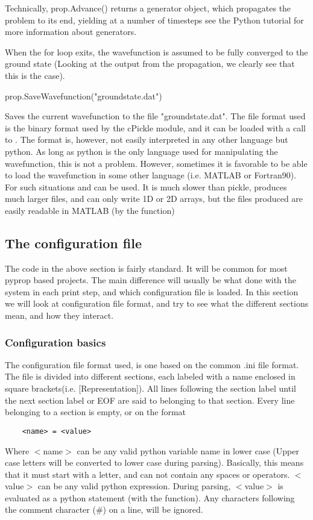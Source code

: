 Technically, prop.Advance() returns a generator object, which propagates the problem to its end, yielding at a number of 
timesteps see the Python tutorial \cite{pythonTut} for more information about generators.

When the for loop exits, the wavefunction is assumed to be fully converged to the ground state (Looking at the output
from the propagation, we clearly see that this is the case). 
\begin{python}	
	prop.SaveWavefunction("groundstate.dat")
\end{python}
Saves the current wavefunction to the file "groundstate.dat". The file format used is the binary format used
by the cPickle module, and it can be loaded with a call to . The format is, however, not 
easily interpreted in any other language but python. As long as python is the only language used for manipulating the 
wavefunction, this is not a problem. However, sometimes it is favorable to be able to load the wavefunction in some
other language (i.e. MATLAB or Fortran90). For such situations  and
can be used. It is much slower than pickle, produces much larger files, and can only write 1D or 2D arrays, but the files
produced are easily readable in MATLAB (by the  function)

\subsection{The configuration file}
The code in the above section is fairly standard. It will be common for most pyprop based projects. The main difference
will usually be what done with the system in each print step, and which configuration file is loaded. In this section we 
will look at configuration file format, and try to see what the different sections mean, and how they interact.

\subsubsection*{Configuration basics}
The configuration file format used, is one based on the common .ini file format. The file is divided into different
sections, each labeled with a name enclosed in square brackets(i.e. [Representation]). All lines following the section
label until the next section label or EOF are said to belonging to that section. Every line belonging to a section is
empty, or on the format 
\begin{verbatim}
	<name> = <value>
\end{verbatim}
Where $<$name$>$ can be any valid python variable name in lower case (Upper case letters will be converted to lower case during
parsing). Basically, this means that it must start with a letter, and can not contain any spaces or operators. 
$<$value$>$ can be any valid python expression. During parsing, $<$value$>$ is evaluated as a python statement 
(with the  function). Any characters following the comment character (\#) on a line, will be ignored.

